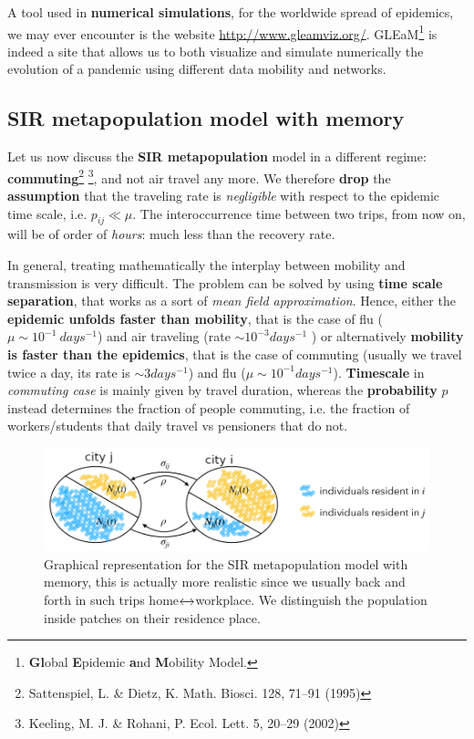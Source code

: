 \documentclass[../main/main.tex]{subfiles}
\begin{document}
A tool used in \textbf{numerical simulations}, for the worldwide spread of epidemics, we may ever encounter is the website \url{http://www.gleamviz.org/}. GLEaM\footnote{\textbf{Gl}obal \textbf{E}pidemic \textbf{a}nd \textbf{M}obility Model.} is indeed a site that allows us to both visualize and simulate numerically the evolution of a pandemic using different data mobility and networks.



\subsection{SIR metapopulation model with memory}

Let us now discuss the \textbf{SIR metapopulation} model in a different regime: \textbf{commuting}\footnote{Sattenspiel, L. \& Dietz, K. Math. Biosci. 128, 71–91 (1995)} \footnote{Keeling, M. J. \& Rohani, P. Ecol. Lett. 5, 20–29 (2002)}, and not air travel any more. We therefore \textbf{drop} the \textbf{assumption} that the traveling rate is \textit{negligible} with respect to the epidemic time scale, i.e. $p_{ij} \ll \mu$. The interoccurrence time between two trips, from now on, will be of order of \textit{hours}: much less than the recovery rate.

In general, treating mathematically the interplay between mobility and transmission is very difficult. The problem can be solved by using \textbf{time scale separation}, that works as a sort of \textit{mean field approximation}. Hence, either the \textbf{epidemic unfolds faster than mobility}, that is the case of flu
($\mu \sim 10^{-1}\ days^{-1}$) and air traveling (rate $\sim 10^{-3} days^{-1}$ ) or alternatively \textbf{mobility is faster than the epidemics}, that is the case of commuting (usually we travel twice a day, its rate is $\sim 3 days^{-1}$) and flu ($\mu \sim 10^{-1} days^{-1}$). \textbf{Timescale} in \textit{commuting case} is mainly given by travel duration, whereas the \textbf{probability} $p$ instead determines the fraction of people commuting, i.e. the fraction of workers/students that daily travel vs pensioners that do not.

\begin{figure}[h!]
\centering
\includegraphics[width=1\textwidth]{../lessons/image/15/image05.png}
\caption{\label{fig:14_05} Graphical representation for the SIR metapopulation model with memory, this is actually more realistic since we usually back and forth in such trips home$\xleftrightarrow[]{}$workplace. We distinguish the population inside patches on their residence place. }
\end{figure}
\end{document}
